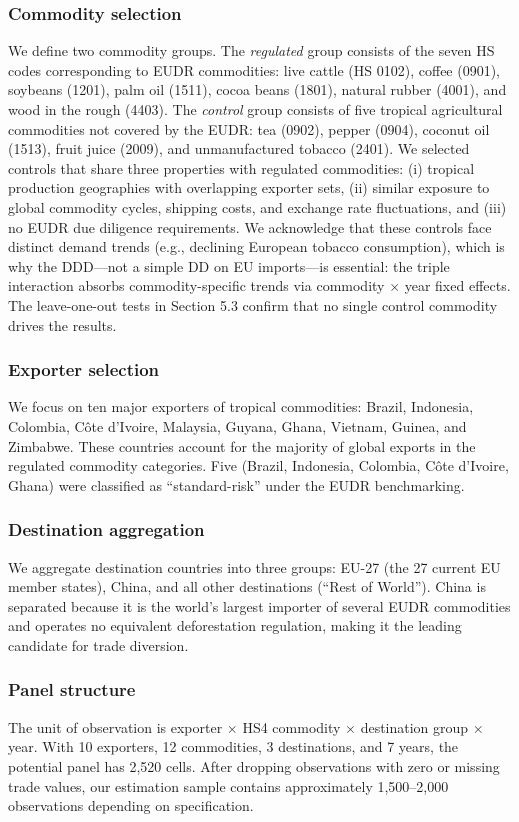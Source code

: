 \documentclass[12pt]{article}
\begin{document}
\subsubsection*{Commodity selection} We define two commodity groups. The \textit{regulated} group consists of the seven HS codes corresponding to EUDR commodities: live cattle (HS 0102), coffee (0901), soybeans (1201), palm oil (1511), cocoa beans (1801), natural rubber (4001), and wood in the rough (4403). The \textit{control} group consists of five tropical agricultural commodities not covered by the EUDR: tea (0902), pepper (0904), coconut oil (1513), fruit juice (2009), and unmanufactured tobacco (2401). We selected controls that share three properties with regulated commodities: (i) tropical production geographies with overlapping exporter sets, (ii) similar exposure to global commodity cycles, shipping costs, and exchange rate fluctuations, and (iii) no EUDR due diligence requirements. We acknowledge that these controls face distinct demand trends (e.g., declining European tobacco consumption), which is why the DDD---not a simple DD on EU imports---is essential: the triple interaction absorbs commodity-specific trends via commodity $\times$ year fixed effects. The leave-one-out tests in Section 5.3 confirm that no single control commodity drives the results.

\subsubsection*{Exporter selection} We focus on ten major exporters of tropical commodities: Brazil, Indonesia, Colombia, C\^ote d'Ivoire, Malaysia, Guyana, Ghana, Vietnam, Guinea, and Zimbabwe. These countries account for the majority of global exports in the regulated commodity categories. Five (Brazil, Indonesia, Colombia, C\^ote d'Ivoire, Ghana) were classified as ``standard-risk'' under the EUDR benchmarking.

\subsubsection*{Destination aggregation} We aggregate destination countries into three groups: EU-27 (the 27 current EU member states), China, and all other destinations (``Rest of World''). China is separated because it is the world's largest importer of several EUDR commodities and operates no equivalent deforestation regulation, making it the leading candidate for trade diversion.

\subsubsection*{Panel structure} The unit of observation is exporter $\times$ HS4 commodity $\times$ destination group $\times$ year. With 10 exporters, 12 commodities, 3 destinations, and 7 years, the potential panel has 2,520 cells. After dropping observations with zero or missing trade values, our estimation sample contains approximately 1,500--2,000 observations depending on specification.
\end{document}
